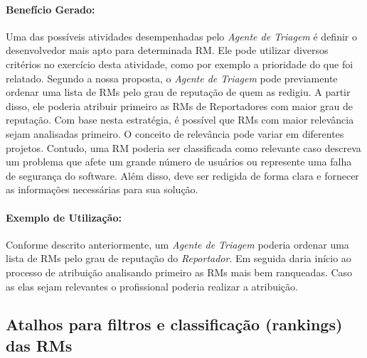
\paragraph{Benefício Gerado:}
\label{par:papéis_afetados_s03}

Uma das possíveis atividades desempenhadas pelo \textit{Agente de Triagem} é
definir o desenvolvedor mais apto para determinada RM\@. Ele pode utilizar
diversos critérios no exercício desta atividade, como por exemplo a prioridade
do que foi relatado. Segundo a nossa proposta, o \textit{Agente de Triagem} pode
previamente ordenar uma lista de RMs pelo grau de reputação de quem as redigiu.
A partir disso, ele poderia atribuir primeiro as RMs de Reportadores com maior
grau de reputação. Com base nesta estratégia, é possível que RMs com maior
relevância sejam analisadas primeiro. O conceito de relevância pode variar em
diferentes projetos. Contudo, uma RM poderia ser classificada como relevante
caso descreva um problema que afete um grande número de usuários ou represente
uma falha de segurança do software. Além disso, deve ser redigida de forma clara
e fornecer as informações necessárias para sua solução.

\paragraph{Exemplo de Utilização:}
\label{par:exemplo_de_utilização_s03}

Conforme descrito anteriormente, um \textit{Agente de Triagem} poderia ordenar
uma lista de RMs pelo grau de reputação do \textit{Reportador}. Em seguida daria
início ao processo de atribuição analisando primeiro as RMs mais bem ranqueadas.
Caso as elas sejam relevantes o profissional poderia realizar a atribuição.

\subsection{Atalhos para filtros e classificação (rankings) das RMs}
\label{sub:histórico_das_ùltimas_rm_s}

